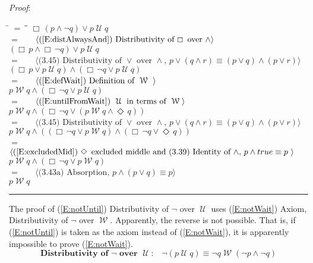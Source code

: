 \documentclass[12pt, fleqn, leqno]{article}
\newcommand{\lgap}{2pt}                             %
\newcommand{\mymathindent}{24pt}                    %
\newcommand{\Until}{\;\mathcal{U}\;}
\newcommand{\Wait}{\;\mathcal{W}\;}
\newcommand{\Event}{\Diamond\,}
\newcommand{\Always}{\Box\,}
\newcommand{\myqed}{\rule[-.23ex]{1.2ex}{2.0ex}}
\newcommand{\myqedtab}{\hspace{384pt}}              %
\newcommand{\Gll} {\langle}                         %
\newcommand{\Ggg} {\rangle}                         %
\newcommand{\Hint}[1]     {\ \ \ $\Gll              \mbox{#1} \Ggg$ }   %
\begin{document}
\emph{Proof}:
\begin{tabbing}
\hspace{\mymathindent} \= $= \;$ \= \myqedtab \= \kill
  \> \>   $\Always (p \land \neg q) \lor p \Until q$\\[\lgap]
 \> $=$  \>  \Hint{(\ref{E:distAlwaysAnd}) Distributivity of $\Always$ over $\land$}\\[\lgap]
  \> \>   $(\Always p \land \Always \neg q) \lor p \Until q$\\[\lgap]
  \> $=$  \>  \Hint{(3.45) Distributivity of $\lor$ over $\land$, $p\lor (q\land r)\equiv (p\lor q)\land (p\lor r)$}\\[\lgap]
  \> \>   $(\Always p \lor p \Until q) \land (\Always \neg q \lor p \Until q)$\\[\lgap]
  \> $=$  \>  \Hint{(\ref{E:defWait}) Definition of $\Wait$ }\\[\lgap]
  \> \>   $p \Wait q \land (\Always \neg q \lor p \Until q)$\\[\lgap]
  \> $=$  \>  \Hint{(\ref{E:untilFromWait}) $\Until$ in terms of $\Wait$}\\[\lgap]
  \> \>   $p \Wait q \land (\Always \neg q \lor (p \Wait q \land \Event q))$\\[\lgap]
  \> $=$  \>  \Hint{(3.45) Distributivity of $\lor$ over $\land$, $p\lor (q\land r)\equiv (p\lor q)\land (p\lor r)$}\\[\lgap]
  \> \>   $p \Wait q \land ((\Always \neg q \lor p \Wait q) \land (\Always \neg q \lor \Event q))$\\[\lgap]
  \> $=$  \>  \Hint{(\ref{E:excludedMid}) $\Event$ excluded middle and (3.39) Identity of $\land$, $p\land true\equiv p$ }\\[\lgap]
  \> \>   $p \Wait q \land (\Always \neg q \lor p \Wait q)$\\[\lgap]
  \> $=$  \>  \Hint{(3.43a) Absorption, $p \land (p \lor q) \equiv p$}\\[\lgap]
  \> \>   $p \Wait q$ \quad \myqed
\end{tabbing}

The proof of (\ref{E:notUntil}) Distributivity of $\neg$ over $\Until$ uses (\ref{E:notWait}) Axiom, Distributivity of $\neg$ over $\Wait$.
Apparently, the reverse is not possible.
That is, if (\ref{E:notUntil}) is taken as the axiom instead of (\ref{E:notWait}), it is apparently impossible to prove (\ref{E:notWait}).
\begin{equation}\label{E:notUntil}
\textbf{Distributivity of $\neg$ over $\Until$:}\quad \neg (p \Until q) \equiv \neg q \Wait (\neg p \land \neg q)
\end{equation}
\end{document}
